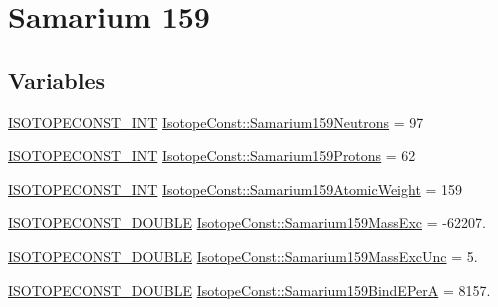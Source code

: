 \hypertarget{group___isotope_const-_samarium-_sm159}{}\section{Samarium 159}
\label{group___isotope_const-_samarium-_sm159}
\subsection*{Variables}
\begin{DoxyCompactItemize}
\item 
\mbox{\hyperlink{group___isotope_const-_macros_ga5f18360b3e99483a35c32d789e62621c}{I\+S\+O\+T\+O\+P\+E\+C\+O\+N\+S\+T\+\_\+\+I\+NT}} \mbox{\hyperlink{group___isotope_const-_samarium-_sm159_gabe4d16adec9ccd27754b73c731197a11}{Isotope\+Const\+::\+Samarium159\+Neutrons}} = 97
\item 
\mbox{\hyperlink{group___isotope_const-_macros_ga5f18360b3e99483a35c32d789e62621c}{I\+S\+O\+T\+O\+P\+E\+C\+O\+N\+S\+T\+\_\+\+I\+NT}} \mbox{\hyperlink{group___isotope_const-_samarium-_sm159_gab7c28683c487810b7fed493f2c237b0a}{Isotope\+Const\+::\+Samarium159\+Protons}} = 62
\item 
\mbox{\hyperlink{group___isotope_const-_macros_ga5f18360b3e99483a35c32d789e62621c}{I\+S\+O\+T\+O\+P\+E\+C\+O\+N\+S\+T\+\_\+\+I\+NT}} \mbox{\hyperlink{group___isotope_const-_samarium-_sm159_gae0a692ddadaf92e3f6757b9937ac39fc}{Isotope\+Const\+::\+Samarium159\+Atomic\+Weight}} = 159
\item 
\mbox{\hyperlink{group___isotope_const-_macros_ga8f45a7272ce02c0b4c65c44636ed719a}{I\+S\+O\+T\+O\+P\+E\+C\+O\+N\+S\+T\+\_\+\+D\+O\+U\+B\+LE}} \mbox{\hyperlink{group___isotope_const-_samarium-_sm159_gaa6500eb0140a0c4eb2531cea0b9c4ed6}{Isotope\+Const\+::\+Samarium159\+Mass\+Exc}} = -\/62207.
\item 
\mbox{\hyperlink{group___isotope_const-_macros_ga8f45a7272ce02c0b4c65c44636ed719a}{I\+S\+O\+T\+O\+P\+E\+C\+O\+N\+S\+T\+\_\+\+D\+O\+U\+B\+LE}} \mbox{\hyperlink{group___isotope_const-_samarium-_sm159_ga4a75ea413d07bb563084ab6178910064}{Isotope\+Const\+::\+Samarium159\+Mass\+Exc\+Unc}} = 5.
\item 
\mbox{\hyperlink{group___isotope_const-_macros_ga8f45a7272ce02c0b4c65c44636ed719a}{I\+S\+O\+T\+O\+P\+E\+C\+O\+N\+S\+T\+\_\+\+D\+O\+U\+B\+LE}} \mbox{\hyperlink{group___isotope_const-_samarium-_sm159_gabfa4f3ba64e89df17ddb99146aad18ff}{Isotope\+Const\+::\+Samarium159\+Bind\+E\+PerA}} = 8157.
\item 

\end{DoxyCompactItemize}
